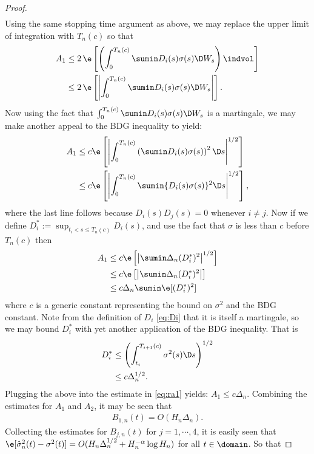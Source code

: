 \begin{appendices}
\begin{proof}
\begin{align}
  \label{}
\end{align}
Using the same stopping time argument as above, we may replace the upper limit of integration with $T_n(c)$ so that 
\begin{align}
  A_1 & \le 2\,\e\left[\left(\int_0^{T_n(c)}\sumin D_i(s) \sigma(s) \D W_s\right)\indvol \right]\notag\\ 
  & \le 2\,\e\left[\left\vert\int_0^{T_n(c)}\sumin D_i(s) \sigma(s) \D W_s\right\vert \right].\notag 
  \label{}
\end{align}
Now using the fact that $\int_0^{T_n(c)}\sumin D_i(s) \sigma(s) \D W_s$ is a  martingale, we may make another appeal to the BDG inequality to yield:
\begin{align}
  A_1 & \le c\e\left[\left\vert\int_0^{T_n(c)}\left(\sumin D_i(s) \sigma(s)\right)^2 \D s\right\vert^{1/2} \right]\notag \\
  & \le c\e\left[\left\vert\int_0^{T_n(c)}\sumin \{D_i(s) \sigma(s)\}^2 \D s\right\vert^{1/2} \right]\notag,
  \notag
  \label{}
\end{align}
where the last line follows because $D_i (s) D_j(s) = 0$ whenever $i \not= j$. Now if  we define $D^*_i := \sup_{t_i <s \le T_n(c)} D_i(s)$, and use the fact that $\sigma$ is less than  $c$ before $T_n(c)$ then
\begin{align}
  A_1 & \le c\e\left[\left\vert\sumin \Delta_n(D_i^*)^2 \right\vert^{1/2} \right] \notag\\
  & \le c\e\left[\left\vert\sumin \Delta_n(D_i^*)^2 \right\vert \right] \notag\\
  & \le c\Delta_n\sumin\e[(D_i^*)^2]   
  \label{eq:ra1}
\end{align}
where $c$ is a generic constant representing the bound on $\sigma^2$ and the BDG constant.  Note  from the definition of  $D_i$ \eqref{eq:Di} that it  is itself a martingale, so we may bound  $D^*_i$  with yet another application of the BDG inequality. That is
\begin{align}
  D^*_i &\le \left(\int^{T_{i+1}(c)}_{t_i} \sigma^2(s) \D s\right)^{1/2} \notag\\
  &\le c \Delta_n^{1/2}. 
  \label{}
\end{align}
Plugging the above into the estimate in \eqref{eq:ra1} yields: $A_1 \le c \Delta_n $. Combining  the estimates for $A_1$ and $A_2$,  it may be seen that
\begin{align}
  B_{1,n}(t) = O(H_n\Delta_n ).
  \label{}
\end{align}
Collecting the estimates for $B_{j,n}(t)$ for $j =1,\cdots,4$, it is easily seen that $\e[\svn(t) - \sigma^2(t)] = O(H_n \Delta_n^{1/2}  +H_n^{-\alpha}\log H_n)$ for all $t \in \domain$. So that 

\end{proof}
\end{appendices}
